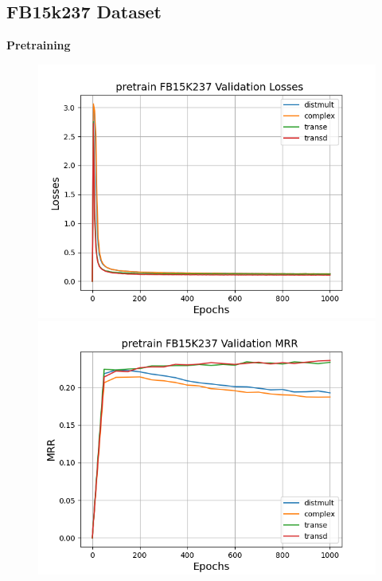 \subsection{FB15k237 Dataset}

\textbf{Pretraining}\\

\begin{figure}
    \centering
    \begin{minipage}{.3\textwidth}
      \centering
      \includegraphics[width=0.9\linewidth]{figures/results/pretrain/fb15k237/pretrain_fb15k237_losses.png}
    \end{minipage}%
    \begin{minipage}{.3\textwidth}
      \centering
      \includegraphics[width=0.9\linewidth]{figures/results/pretrain/fb15k237/pretrain_fb15k237_mrrs.png}
    \end{minipage}

\end{figure}
